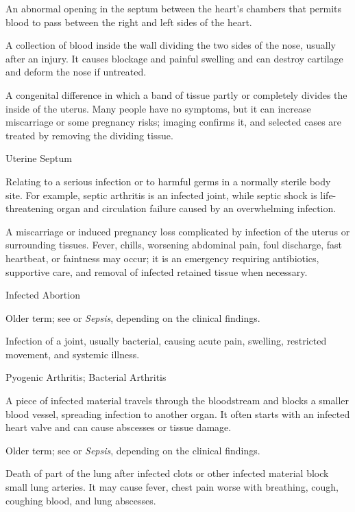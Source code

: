  An abnormal opening in the septum between the heart's chambers that permits blood to pass between the right and left sides of the heart.

 A collection of blood inside the wall dividing the two sides of the nose, usually after an injury. It causes blockage and painful swelling and can destroy cartilage and deform the nose if untreated.

 A congenital difference in which a band of tissue partly or completely divides the inside of the uterus. Many people have no symptoms, but it can increase miscarriage or some pregnancy risks; imaging confirms it, and selected cases are treated by removing the dividing tissue.

\synonyms
Uterine Septum

 Relating to a serious infection or to harmful germs in a normally sterile body site. For example, septic arthritis is an infected joint, while septic shock is life-threatening organ and circulation failure caused by an overwhelming infection.

 A miscarriage or induced pregnancy loss complicated by infection of the uterus or surrounding tissues. Fever, chills, worsening abdominal pain, foul discharge, fast heartbeat, or faintness may occur; it is an emergency requiring antibiotics, supportive care, and removal of infected retained tissue when necessary.

\synonyms
Infected Abortion

 Older term; see  or \textit{Sepsis}, depending on the clinical findings.

 Infection of a joint, usually bacterial, causing acute pain, swelling, restricted movement, and systemic illness.

\synonyms
Pyogenic Arthritis; Bacterial Arthritis

 A piece of infected material travels through the bloodstream and blocks a smaller blood vessel, spreading infection to another organ. It often starts with an infected heart valve and can cause abscesses or tissue damage.

 Older term; see  or \textit{Sepsis}, depending on the clinical findings.

 Death of part of the lung after infected clots or other infected material block small lung arteries. It may cause fever, chest pain worse with breathing, cough, coughing blood, and lung abscesses.

